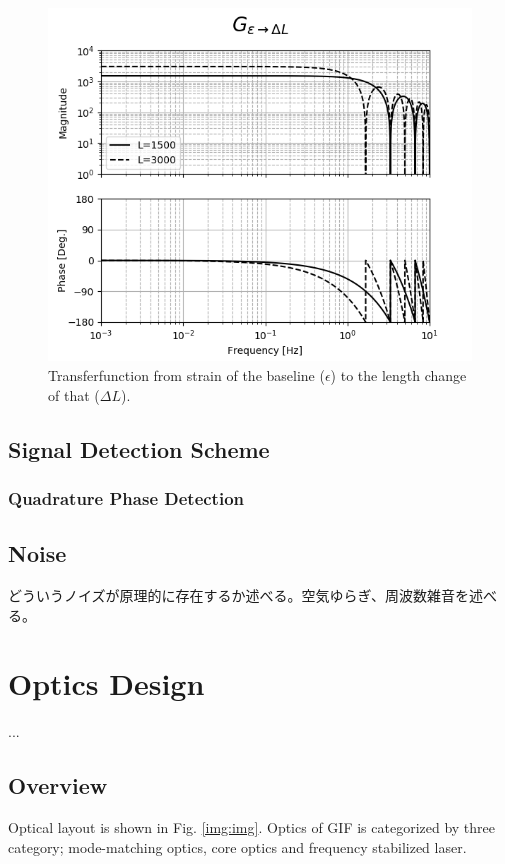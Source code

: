 \begin{figure}[h]
  \begin{center}
    \includegraphics[width=12.0cm]{./img_chap4/img412.png}
    \caption{Transferfunction from strain of the baseline ($\epsilon$) to the length change of that ($\Delta{L}$). }
  \end{center}
\end{figure}


\subsection{Signal Detection Scheme}
\subsubsection{Quadrature Phase Detection}


\subsection{Noise}


どういうノイズが原理的に存在するか述べる。空気ゆらぎ、周波数雑音を述べる。


\section{Optics Design} %
...\\
\subsection{Overview}
Optical layout is shown in Fig. \ref{img:img}. Optics of GIF is categorized by three category; mode-matching optics, core optics and frequency stabilized laser.


